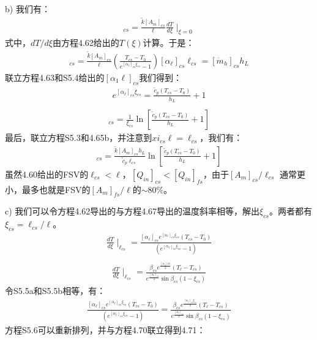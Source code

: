 b) 我们有：
\begin{align*}
[Q_{in}]_{cs}=\frac{\tilde{k}[A_m]_{cs}}{\ell}\frac{dT}{d\xi}\mid_{\xi=0} \tag{S5.3}
\end{align*}
式中，$dT/d\xi$由方程4.62给出的$T(\xi)$计算。于是：
\begin{align*}
[Q_{in}]_{cs}=\frac{\tilde{k}[A_m]_{cs}}{\ell}(\frac{T_{cs}-T_0}{e^{[\alpha_\ell]_{cs}\xi_{cs}}-1})[\alpha_\ell]_{cs}\ell_{cs}=[\dot{m}_h]_{cs}h_L \tag{S5.4}
\end{align*}
联立方程4.63和S5.4给出的$[\alpha_{1}\ell]_{cs}$我们得到：
\begin{align*}%
e^{[\alpha_\ell]_{cs}\xi_{cs}}=\frac{\tilde{c}_p(T_{cs}-T_0)}{h_L}+1\\ \tag{4.65}
\end{align*}
\begin{align*}%
[\alpha_\ell]_{cs}=\frac{1}{\xi_{cs}}\ln[\frac{\tilde{c}_p(T_{cs}-T_0)}{h_L}+1] \tag{4.65b}
\end{align*}
最后，联立方程S5.3和4.65b，并注意到$xi_{cs}\ell=\ell_{cs}$，我们有：
\begin{align*}%
[Q_{in}]_{cs}=\frac{\tilde{k}[A_m]_{cs}h_L}{\tilde{c}_p\ell_{cs}}\ln[\frac{\tilde{c}_p(T_{cs}-T_0)}{h_L}+1] \tag{4.64}
\end{align*}
虽然4.60给出的FSV的$\ell_{cs}<\ell$，$[Q_{in}]_{cs}<[Q_{in}]_{fs}$，由于$[A_m]_{cs}/\ell_{cs}$
通常更小，最多也就是FSV的$[A_m]_{fs}/\ell$的$\sim 80\%$。

c) 我们可以令方程4.62导出的与方程4.67导出的温度斜率相等，解出$\xi_{cs}$。两者都有$\xi_{cs}=\ell_{cs}/\ell$。
\begin{align*}
\frac{dT}{d\xi}\mid_{\ell_{cs}}=\frac{[\alpha_\ell]_{cs}e^{[\alpha_\ell]_{cs}\xi_{cs}}(T_{cs}-T_0)}{(e^{[\alpha_\ell]_{cs}\xi_{cs}}-1)}\\\tag{S5.5a}
\end{align*}
\begin{align*}
\frac{dT}{d\xi}\mid_{\ell_{cs}}=\frac{\beta_{cs}e^{\frac{[\alpha_\ell]{cs}}{2}}(T_\ell-T_{cs})}{e^{\frac{[\alpha_\ell]_{cs}}{2}}\sin\beta_{cs}(1-\xi_{cs})} \tag{S5.5b}
\end{align*}
令S5.5a和S5.5b相等，有：
\begin{align*}
\frac{[\alpha_\ell]_{cs}e^{[\alpha_\ell]_{cs}\xi_{cs}}(T_{cs}-T_0)}{(e^{[\alpha_\ell]_{cs}\xi_{cs}}-1)}
=\frac{\beta_{cs}e^{\frac{[\alpha_\ell]_{cs}\xi_{cs}}{2}}(T_\ell-T_{cs})}{e^{\frac{[\alpha_\ell]_{cs}}{2}}\sin\beta_{cs}(1-\xi_{cs})} \tag{S5.6}
\end{align*}
方程S5.6可以重新排列，并与方程4.70联立得到4.71：

